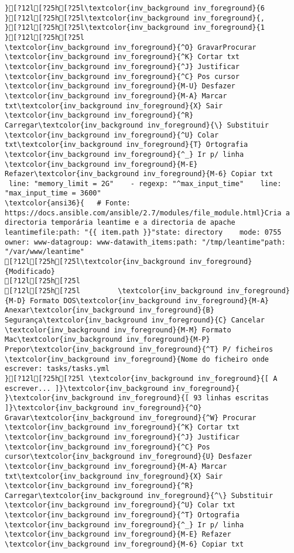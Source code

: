 \documentclass{scrartcl}
\begin{document}
\begin{Verbatim}
}[?12l[?25h[?25l\textcolor{inv_background inv_foreground}{6
}[?12l[?25h[?25l\textcolor{inv_background inv_foreground}{,
}[?12l[?25h[?25l\textcolor{inv_background inv_foreground}{1
}[?12l[?25h[?25l
\textcolor{inv_background inv_foreground}{^O} GravarProcurar      \textcolor{inv_background inv_foreground}{^K} Cortar txt    \textcolor{inv_background inv_foreground}{^J} Justificar    \textcolor{inv_background inv_foreground}{^C} Pos cursor    \textcolor{inv_background inv_foreground}{M-U} Desfazer     \textcolor{inv_background inv_foreground}{M-A} Marcar txt\textcolor{inv_background inv_foreground}{X} Sair    \textcolor{inv_background inv_foreground}{^R} Carregar\textcolor{inv_background inv_foreground}{\} Substituir    \textcolor{inv_background inv_foreground}{^U} Colar txt\textcolor{inv_background inv_foreground}{T} Ortografia    \textcolor{inv_background inv_foreground}{^_} Ir p/ linha   \textcolor{inv_background inv_foreground}{M-E} Refazer\textcolor{inv_background inv_foreground}{M-6} Copiar txt
 line: "memory_limit = 2G"    - regexp: "^max_input_time"    line: "max_input_time = 3600"
\textcolor{ansi36}{   # Fonte: https://docs.ansible.com/ansible/2.7/modules/file_module.html}Cria a directoria temporária leantime e a directoria de apache leantimefile:path: "{{ item.path }}"state: directory    mode: 0755  owner: www-datagroup: www-datawith_items:path: "/tmp/leantime"path: "/var/www/leantime"
[?12l[?25h[?25l\textcolor{inv_background inv_foreground}{Modificado}
[?12l[?25h[?25l
[?12l[?25h[?25l         \textcolor{inv_background inv_foreground}{M-D} Formato DOS\textcolor{inv_background inv_foreground}{M-A} Anexar\textcolor{inv_background inv_foreground}{B} Segurança\textcolor{inv_background inv_foreground}{C} Cancelar           \textcolor{inv_background inv_foreground}{M-M} Formato Mac\textcolor{inv_background inv_foreground}{M-P} Prepor\textcolor{inv_background inv_foreground}{^T} P/ ficheiros
\textcolor{inv_background inv_foreground}{Nome do ficheiro onde escrever: tasks/tasks.yml                                                                                           }[?12l[?25h[?25l \textcolor{inv_background inv_foreground}{[ A escrever... ]}\textcolor{inv_background inv_foreground}{          }\textcolor{inv_background inv_foreground}{[ 93 linhas escritas ]}\textcolor{inv_background inv_foreground}{^O} Gravar\textcolor{inv_background inv_foreground}{^W} Procurar      \textcolor{inv_background inv_foreground}{^K} Cortar txt    \textcolor{inv_background inv_foreground}{^J} Justificar    \textcolor{inv_background inv_foreground}{^C} Pos cursor\textcolor{inv_background inv_foreground}{U} Desfazer     \textcolor{inv_background inv_foreground}{M-A} Marcar txt\textcolor{inv_background inv_foreground}{X} Sair    \textcolor{inv_background inv_foreground}{^R} Carregar\textcolor{inv_background inv_foreground}{^\} Substituir    \textcolor{inv_background inv_foreground}{^U} Colar txt     \textcolor{inv_background inv_foreground}{^T} Ortografia    \textcolor{inv_background inv_foreground}{^_} Ir p/ linha   \textcolor{inv_background inv_foreground}{M-E} Refazer      \textcolor{inv_background inv_foreground}{M-6} Copiar txt

\end{Verbatim}
\end{document}
